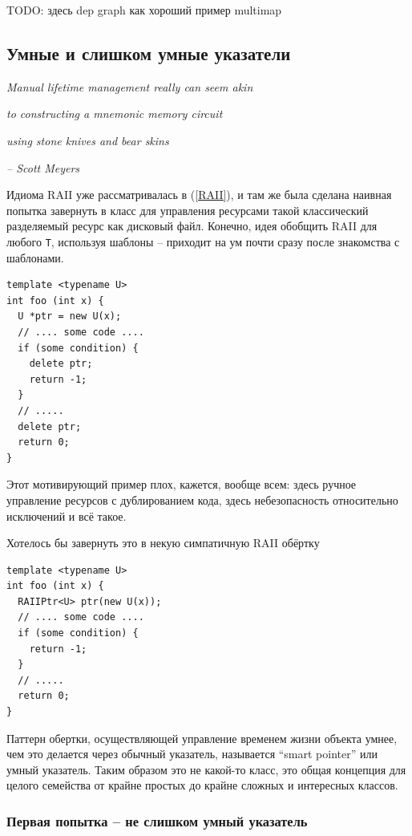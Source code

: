\documentclass[a4paper,12pt,oneside]{article}
\begin{document}
TODO: здесь dep graph как хороший пример multimap


\pagebreak
\subsection{Умные и слишком умные указатели}\label{SmartPointers}

\hfill\textit{Manual lifetime management really can seem akin}

\hfill\textit{to constructing a mnemonic memory circuit}

\hfill\textit{using stone knives and bear skins}{\vspace{0.5em}}

\hfill\textit{-- Scott Meyers}

Идиома RAII уже рассматривалась в (\ref{RAII}), и там же была сделана наивная попытка завернуть в класс для управления ресурсами такой классический разделяемый ресурс как дисковый файл. Конечно, идея обобщить RAII для любого \lstinline!T!, используя шаблоны -- приходит на ум почти сразу после знакомства с шаблонами.

\begin{lstlisting}
template <typename U>
int foo (int x) {
  U *ptr = new U(x);
  // .... some code ....
  if (some condition) {
    delete ptr; 
    return -1;
  }
  // .....
  delete ptr;
  return 0;
}
\end{lstlisting}

Этот мотивирующий пример плох, кажется, вообще всем: здесь ручное управление ресурсов с дублированием кода, здесь небезопасность относительно исключений и всё такое.

Хотелось бы завернуть это в некую симпатичную RAII обёртку

\begin{lstlisting}
template <typename U>
int foo (int x) {
  RAIIPtr<U> ptr(new U(x));
  // .... some code ....
  if (some condition) {
    return -1;
  }
  // .....
  return 0;
}
\end{lstlisting}

Паттерн обертки, осуществляющей управление временем жизни объекта умнее, чем это делается через обычный указатель, называется ``smart pointer'' или умный указатель. Таким образом это не какой-то класс, это общая концепция для целого семейства от крайне простых до крайне сложных и интересных классов.

\subsubsection{Первая попытка -- не слишком умный указатель}
\end{document}
